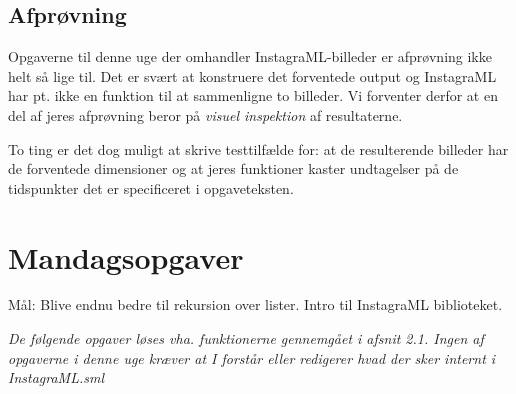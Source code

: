 \documentclass[a4paper,12pt]{article}
\begin{document}


\subsection{Afprøvning}
Opgaverne til denne uge der omhandler InstagraML-billeder er
afprøvning ikke helt så lige til. Det er svært at konstruere det
forventede output og InstagraML har pt. ikke en funktion til at
sammenligne to billeder. Vi forventer derfor at en del af jeres
afprøvning beror på \textit{visuel inspektion} af
resultaterne.

To ting er det dog muligt at skrive testtilfælde for: at de
resulterende billeder har de forventede dimensioner og at jeres
funktioner kaster undtagelser på de tidspunkter det er specificeret i
opgaveteksten.

\newpage
\section{Mandagsopgaver}
\label{sec:mandagsopgaver}
Mål: Blive endnu bedre til rekursion over lister. Intro til InstagraML
biblioteket.


\textit{De følgende opgaver løses vha. funktionerne gennemgået i
  afsnit 2.1. Ingen af opgaverne i denne uge kræver at I forstår eller
  redigerer hvad der sker internt i InstagraML.sml}
\end{document}

